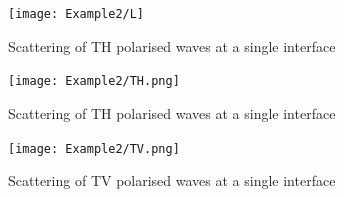 
\begin{figure}[p]
    \centering
    \texttt{[image: Example2/L]}
    \caption{Scattering of TH polarised waves at a single interface}
    \label{fig:totalMultiL}
\end{figure}

\begin{figure}[p]
    \centering
    \texttt{[image: Example2/TH.png]}
    \caption{Scattering of TH polarised waves at a single interface}
    \label{fig:totalMultiTH}
\end{figure}

\begin{figure}[p]
    \centering
    \texttt{[image: Example2/TV.png]}
    \caption{Scattering of TV polarised waves at a single interface}
    \label{fig:totalMultiTV}
\end{figure}
